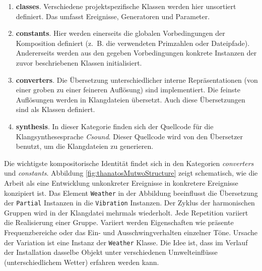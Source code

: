 \documentclass[12pt,a4paper,ngerman]{article}
\begin{document}
\begin{enumerate}
    \item{%
        \textbf{classes}.
        Verschiedene projektspezifische Klassen werden hier unsortiert definiert.
        Das umfasst Ereignisse, Generatoren und Parameter.
    }

    \item{%
        \textbf{constants}.
        Hier werden einerseits die globalen Vorbedingungen der Komposition definiert (z.~B. die verwendeten Primzahlen oder Dateipfade).
        Andererseits werden aus den gegeben Vorbedingungen konkrete Instanzen der zuvor beschriebenen Klassen initialisiert.
    }

    \item{%
        \textbf{converters}.
        Die Übersetzung unterschiedlicher interne Repräsentationen (von einer groben zu einer feineren Auflösung) sind implementiert.
        Die feinste Auflösungen werden in Klangdateien übersetzt.
        Auch diese Übersetzungen sind als Klassen definiert.
    }

    \item{%
        \textbf{synthesis}.
        In dieser Kategorie finden sich der Quellcode für die Klangsynthesesprache \emph{Csound}.
        Dieser Quellcode wird von den Übersetzer benutzt, um die Klangdateien zu generieren.
    }
\end{enumerate}

Die wichtigste kompositorische Identität findet sich in den Kategorien \emph{converters} und \emph{constants}.
Abbildung \ref{fig:thanatosMutwoStructure} zeigt schematisch, wie die Arbeit als eine Entwicklung unkonkreter Ereignisse in konkretere Ereignisse konzipiert ist.
Das Element \texttt{Weather} in der Abbildung beeinflusst die Übersetzung der \texttt{Partial} Instanzen in die \texttt{Vibration} Instanzen.
Der Zyklus der harmonischen Gruppen wird in der Klangdatei mehrmals wiederholt.
Jede Repetition variiert die Realisierung einer Gruppe.
Variiert werden Eigenschaften wie präsente Frequenzbereiche oder das Ein- und Ausschwingverhalten einzelner Töne.
Ursache der Variation ist eine Instanz der \texttt{Weather} Klasse.
Die Idee ist, dass im Verlauf der Installation dasselbe Objekt unter verschiedenen Umwelteinflüsse (unterschiedlichem Wetter) erfahren werden kann.

\bigskip

%
%
%
%
\end{document}
